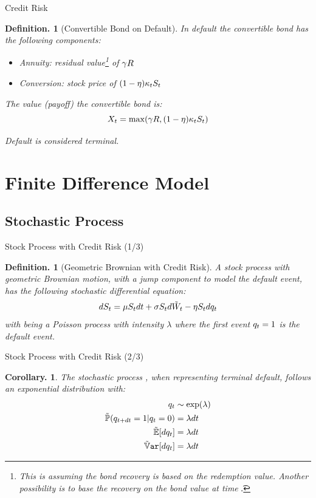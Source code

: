 \documentclass{beamer}
\newtheorem{cor}[thm]{Corollary.}
\newtheorem{defn}[thm]{Definition.}
\begin{document}
\begin{frame}{Credit Risk}
\begin{defn}[Convertible Bond on Default]
In default the convertible bond has the following components:
\begin{itemize}
 \item \emph{Annuity:} residual value\footnote{This is assuming the bond recovery is based on the redemption value.  Another possibility is to base the recovery on the bond value at time \t.} of $\gamma R$
 \item \emph{Conversion:} stock price of $(1 - \eta)\kappa_tS_t$
\end{itemize}

The value (payoff) the convertible bond is:
\begin{equation}
 X_t = \max(\gamma R, (1 - \eta)\kappa_tS_t)
\end{equation}

Default is considered terminal.
\end{defn}
\end{frame}


\section{Finite Difference Model} %


\subsection{Stochastic Process}

\begin{frame}{Stock Process with Credit Risk (1/3)}
\begin{defn}[Geometric Brownian with Credit Risk]
A stock process with geometric Brownian motion, with a jump component to model the default event, has the following stochastic differential equation:
\begin{equation}
 dS_t = \mu S_tdt + \sigma S_td\tilde{W}_t - \eta S_tdq_t
\end{equation}
with \q being a Poisson process with intensity $\lambda$ where the first event $q_t = 1$ is the default event.
\end{defn}
\end{frame}

\begin{frame}{Stock Process with Credit Risk (2/3)}
\begin{cor}
The stochastic process \q, when representing terminal default, follows an exponential distribution with:
\begin{align}
 \q                       &\sim \exp(\lambda) \\
 \Prob(\qdt = 1 | \q = 0) &= \lambda\dt \\
 \E[\dq]                  &= \lambda\dt \\
 \Var[\dq]                &= \lambda\dt
\end{align}
\end{cor}
\end{frame}
\end{document}
